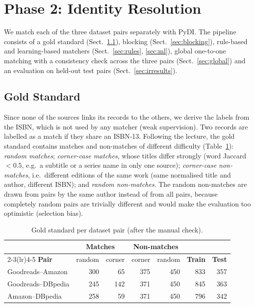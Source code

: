 \documentclass[runningheads]{llncs}
\begin{document}
\section{Phase 2: Identity Resolution}

We match each of the three dataset pairs separately with PyDI. The pipeline
consists of a gold standard (Sect.~\ref{sec:gs}), blocking
(Sect.~\ref{sec:blocking}), rule-based and learning-based matchers
(Sect.~\ref{sec:rules}, \ref{sec:ml}), global one-to-one matching with a
consistency check across the three pairs (Sect.~\ref{sec:global}) and an
evaluation on held-out test pairs (Sect.~\ref{sec:irresults}).

\subsection{Gold Standard}\label{sec:gs}
Since none of the sources links its records to the others, we derive the labels
from the ISBN, which is not used by any matcher (weak supervision). Two records
are labelled as a match if they share an ISBN-13. Following the lecture, the
gold standard contains matches and non-matches of different difficulty
(Table~\ref{tab:gs}): \emph{random matches}; \emph{corner-case matches}, whose
titles differ strongly (word Jaccard $<0.5$, e.g.\ a subtitle or a series name
in only one source); \emph{corner-case non-matches}, i.e.\ different editions of
the same work (same normalised title and author, different ISBN); and
\emph{random non-matches}. The random non-matches are drawn from pairs by the
same author instead of from all pairs, because completely random pairs are
trivially different and would make the evaluation too optimistic (selection
bias).

\begin{table}[htbp]
\centering
\caption{Gold standard per dataset pair (after the manual check).}
\label{tab:gs}
\footnotesize
\begin{tabular}{lrrrrrr}
\toprule
 & \multicolumn{2}{c}{\textbf{Matches}} & \multicolumn{2}{c}{\textbf{Non-matches}} & & \\
\cmidrule(lr){2-3}\cmidrule(lr){4-5}
\textbf{Pair} & random & corner & corner & random & \textbf{Train} & \textbf{Test} \\
\midrule
Goodreads--Amazon  & 300 & 65  & 375 & 450 & 833 & 357 \\
Goodreads--DBpedia & 245 & 142 & 371 & 450 & 845 & 363 \\
Amazon--DBpedia    & 258 & 59  & 371 & 450 & 796 & 342 \\
\bottomrule
\end{tabular}
\end{table}
\end{document}
